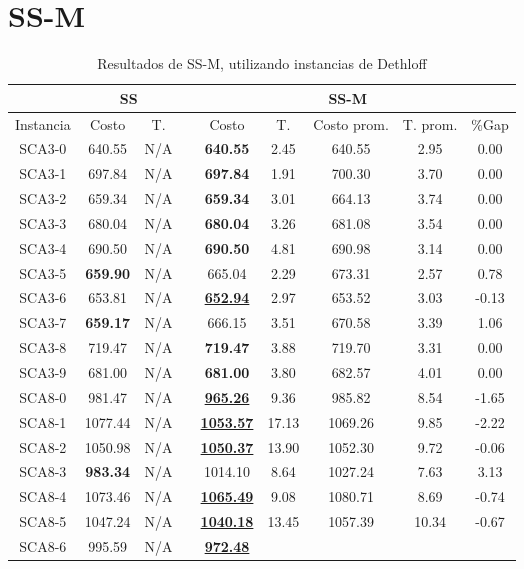 \clearpage
\section{SS-M}\label{tablas-finales-ss}

\begin{table}[h]
\caption{ Resultados de SS-M, utilizando instancias de Dethloff}
\centering
\scriptsize
\begin{tabular*}{1.00\textwidth}{@{\extracolsep{\fill}} |c||c c||c c c c c c|}
\hline
 & \multicolumn{2}{c||}{\bf{SS}} & \multicolumn{6}{c|}{\bf{SS-M}}\\\hline
Instancia & Costo & T. & & Costo & T. & Costo prom. & T. prom. & \%Gap\\ [0.5ex]
\hline\hline
SCA3-0 & 640.55 & N/A & & \bf{640.55} & 
2.45 & 640.55 & 2.95 & 0.00\\SCA3-1 & 697.84 & N/A & & \bf{697.84} & 
1.91 & 700.30 & 3.70 & 0.00\\SCA3-2 & 659.34 & N/A & & \bf{659.34} & 
3.01 & 664.13 & 3.74 & 0.00\\SCA3-3 & 680.04 & N/A & & \bf{680.04} & 
3.26 & 681.08 & 3.54 & 0.00\\SCA3-4 & 690.50 & N/A & & \bf{690.50} & 
4.81 & 690.98 & 3.14 & 0.00\\SCA3-5 & \bf{659.90} & N/A & & 
665.04 & 2.29 & 673.31 & 2.57 & 0.78\\SCA3-6 & 653.81 & N/A & & \bf{\underline{652.94}} & 
2.97 & 653.52 & 3.03 & -0.13\\SCA3-7 & \bf{659.17} & N/A & & 
666.15 & 3.51 & 670.58 & 3.39 & 1.06\\SCA3-8 & 719.47 & N/A & & \bf{719.47} & 
3.88 & 719.70 & 3.31 & 0.00\\SCA3-9 & 681.00 & N/A & & \bf{681.00} & 
3.80 & 682.57 & 4.01 & 0.00\\SCA8-0 & 981.47 & N/A & & \bf{\underline{965.26}} & 
9.36 & 985.82 & 8.54 & -1.65\\SCA8-1 & 1077.44 & N/A & & \bf{\underline{1053.57}} & 
17.13 & 1069.26 & 9.85 & -2.22\\SCA8-2 & 1050.98 & N/A & & \bf{\underline{1050.37}} & 
13.90 & 1052.30 & 9.72 & -0.06\\SCA8-3 & \bf{983.34} & N/A & & 
1014.10 & 8.64 & 1027.24 & 7.63 & 3.13\\SCA8-4 & 1073.46 & N/A & & \bf{\underline{1065.49}} & 
9.08 & 1080.71 & 8.69 & -0.74\\SCA8-5 & 1047.24 & N/A & & \bf{\underline{1040.18}} & 
13.45 & 1057.39 & 10.34 & -0.67\\SCA8-6 & 995.59 & N/A & & \bf{\underline{972.48}} & 

\end{tabular*}
\end{table}
